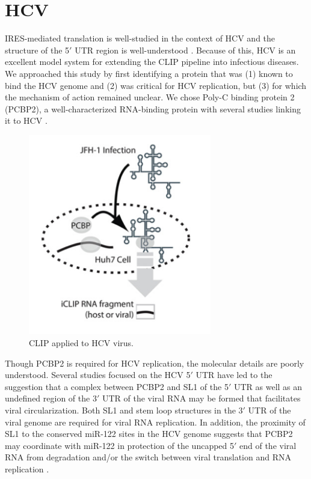 \section{HCV}

IRES-mediated translation is well-studied in the context of HCV and the structure of the 5$'$ UTR region is well-understood \cite{Fraser:2006kn}. Because of this, HCV is an excellent model system for extending the CLIP pipeline into infectious diseases. We approached this study by first identifying a protein that was (1) known to bind the HCV genome and (2) was critical for HCV replication, but (3) for which the mechanism of action remained unclear. We chose Poly-C binding protein 2 (PCBP2), a well-characterized RNA-binding protein with several studies linking it to HCV \cite{GarciaSastre:2013ko}.

\begin{figure}
\center\includegraphics[width=80mm,scale=0.5]{Figures/Fig20}
\caption{CLIP applied to HCV virus.}
\label{fig:Fig20}
\end{figure}

Though PCBP2 is required for HCV replication, the molecular details are poorly understood. Several studies focused on the HCV 5$'$ UTR have led to the suggestion that a complex between PCBP2 and SL1 of the 5$'$ UTR as well as an undefined region of the 3$'$ UTR of the viral RNA may be formed that facilitates viral circularization. Both SL1 and stem loop structures in the  3$'$ UTR of the viral genome are required for viral RNA replication. In addition, the proximity of SL1 to the conserved miR-122 sites in the HCV genome suggests that PCBP2 may coordinate with miR-122 in protection of the uncapped 5$'$ end of the viral RNA from degradation and/or the switch between viral translation and RNA replication \cite{GarciaSastre:2013ko}.


